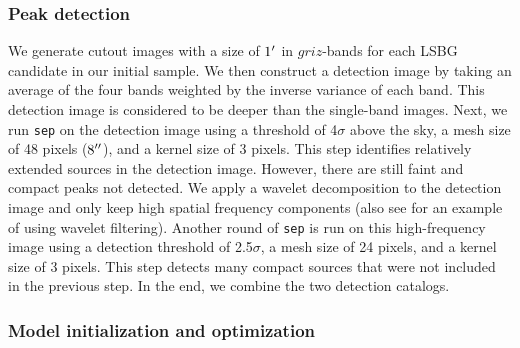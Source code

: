 \documentclass[twocolumn,astrosymb,twocolappendix]{aastex631}
\newcommand{\code}[1]{\texttt{#1}}
\begin{document}
\begin{CJK*}{UTF8}{gbsn}
\subsubsection{Peak detection}\label{sec:peak}
We generate cutout images with a size of $1\mbox{$^\prime$}$ in $griz$-bands for each LSBG candidate in our initial sample. We then construct a detection image by taking an average of the four bands weighted by the inverse variance of each band. This detection image is considered to be deeper than the single-band images. 
Next, we run \code{sep} on the detection image using a threshold of 4$\sigma$ above the sky, a mesh size of 48 pixels ($8\mbox{$^{\prime\prime}$}$), and a kernel size of 3 pixels. This step identifies relatively extended sources in the detection image. However, there are still faint and compact peaks not detected. We apply a wavelet decomposition to the detection image \citep{Starck2015} and only keep high spatial frequency components (also see \citealt{Zaritsky2019} for an example of using wavelet filtering). Another round of \code{sep} is run on this high-frequency image using a detection threshold of 2.5$\sigma$, a mesh size of 24 pixels, and a kernel size of 3 pixels. This step detects many compact sources that were not included in the previous step. In the end, we combine the two detection catalogs. 

\subsubsection{Model initialization and optimization}


\end{CJK*}
\end{document}
